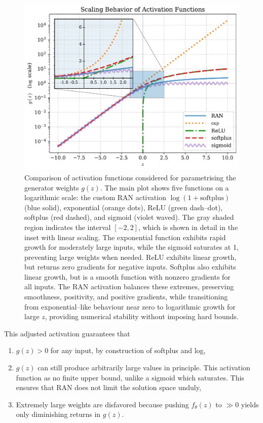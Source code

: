 {{            \begin{figure}
                \label{fig:ran-activations}
                \includegraphics[width=\linewidth]{figures/chapter-06/activations.pdf}
\caption[Comparison of activation functions for neural network weight parametrisation]{Comparison of activation functions considered for parametrising the generator weights $g(z)$. The main plot shows five functions on a logarithmic scale: the custom RAN activation $\log(1 + \text{softplus})$ (blue solid), exponential (orange dots), ReLU (green dash--dot), softplus (red dashed), and sigmoid (violet waved). The gray shaded region indicates the interval $[-2, 2]$, which is shown in detail in the inset with linear scaling. The exponential function exhibits rapid growth for moderately large inputs, while the sigmoid saturates at 1, preventing large weights when needed. ReLU exhibits linear growth, but returns zero gradients for negative inputs. Softplus also exhibits linear growth, but is a smooth function with nonzero gradients for all inputs.
%
The RAN activation balances these extremes, preserving smoothness, positivity, and positive gradients, while transitioning from exponential--like behaviour near zero to logarithmic growth for large $z$, providing numerical stability without imposing hard bounds.}
            \end{figure}
            This adjusted activation guarantees that
            \begin{enumerate}
                \item $g(z) > 0$ for any input, by construction of softplus and log,
                \item \(g(z)\) can still produce arbitrarily large values in principle. This activation function as no finite upper bound, unlike a sigmoid which saturates.%
                This ensures that RAN does not limit the solution space unduly, 
                \item Extremely large weights are disfavored because pushing $f_\theta(z)$ to $\gg 0$ yields only diminishing returns in $g(z)$.
            \end{enumerate}
            
}}
